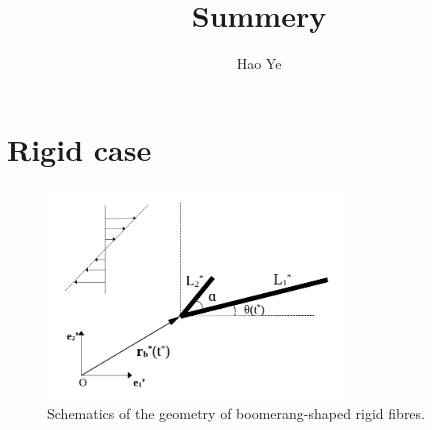 \documentclass[a4paper,12pt]{report}
\title{Summery}
\author{Hao Ye} %
\begin{document}
\maketitle
\chapter{Rigid case}
\begin{figure}[htb]
	\begin{center}
		\includegraphics[width=0.7\textwidth]{plot/rigid_case/schematic_rigid_configuration.png}
		\caption{Schematics of the geometry of boomerang-shaped rigid fibres.}
		\label{fig:21}
	\end{center}
\end{figure}
\end{document}
